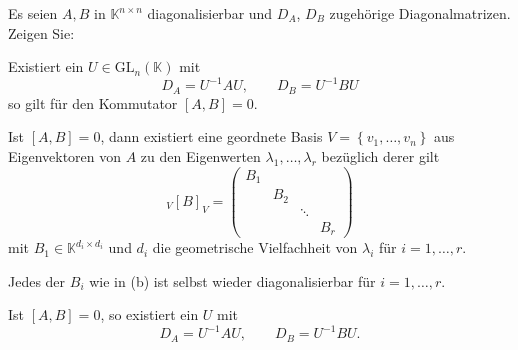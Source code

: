 \begin{Problem}
	Es seien $A,B$ in $\mathbb{K}^{n\times n}$ diagonalisierbar und $D_A$, $D_B$ zugehörige Diagonalmatrizen. Zeigen Sie:
	\begin{parts}
	\item Existiert ein $U\in \text{GL}_n(\mathbb{K})$ mit
		\[
			D_A=U^{-1}AU,\qquad D_B=U^{-1}BU
		\]
		so gilt f\"{u}r den Kommutator $[A,B]=0$.
	\item Ist $[A,B]=0$, dann existiert eine geordnete Basis $V=\left\{ v_1,\dots, v_n \right\} $ aus Eigenvektoren von $A$ zu den Eigenwerten $\lambda_1,\dots, \lambda_r$ bezüglich derer gilt
		\[
			_V[B]_V=\begin{pmatrix} B_1 & & &\\ & B_2 & &\\& & \ddots &\\ & & & B_r \end{pmatrix} 
		\]
		mit $B_1\in\mathbb{K}^{d_i\times d_i}$ und $d_i$ die geometrische Vielfachheit von $\lambda_i$ f\"{u}r $i=1,\dots, r$.
	\item Jedes der $B_i$ wie in (b) ist selbst wieder diagonalisierbar f\"{u}r $i=1,\dots, r$.
	\item Ist $[A,B]=0$, so existiert ein $U$ mit
		\[
			D_A=U^{-1}AU,\qquad D_B=U^{-1}BU
		.\] 
	\end{parts}
\end{Problem}
